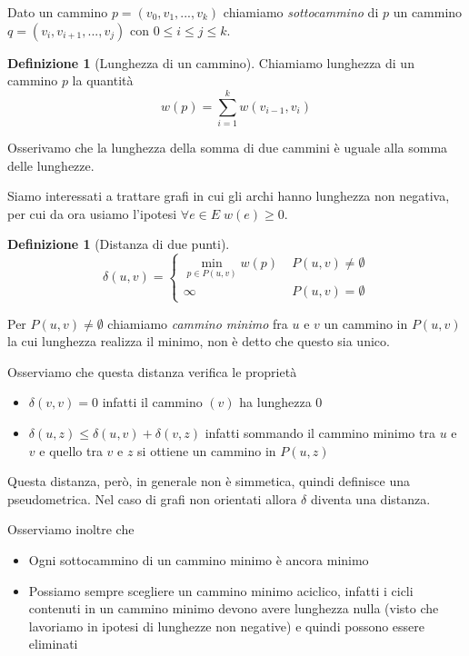 \documentclass[a4paper,10pt]{amsbook}
\newcounter{counter1}
\theoremstyle{plain}
\theoremstyle{definition}
\newtheorem{mydef}[counter1]{Definizione}
\theoremstyle{remark}
\newcommand{\pa}[1]{\left(#1\right)}
\begin{document}
Dato un cammino $p = ( v_0, v_1, ..., v_k)$ chiamiamo
\textit{sottocammino} di $p$ un cammino $q = ( v_i , v_{i+1}, ... ,
v_j )$ con $0 \le i \le j \le k$.

\begin{mydef}[Lunghezza di un cammino]
  Chiamiamo lunghezza di un cammino $p$ la quantità
  \[ w(p) = \sum _{i=1} ^k w \pa{ v_{i-1}, v_i } \]
\end{mydef}

Osserivamo che la lunghezza della somma di due cammini è uguale alla
somma delle lunghezze.

Siamo interessati a trattare grafi in cui gli archi hanno lunghezza
non negativa, per cui da ora usiamo l'ipotesi $\forall e \in E \; w(e)
\ge 0$.

\begin{mydef}[Distanza di due punti]
  \[ \delta(u,v) = \left\{
    \begin{matrix}
      \min \limits_{p \in P(u,v)} { w(p) } & \; P(u,v) \neq \emptyset \\
      \infty & \; P(u,v) = \emptyset
    \end{matrix}
    \right.
    \]
\end{mydef}

Per $P(u,v) \neq \emptyset$ chiamiamo \textit{cammino minimo} fra $u$
e $v$ un cammino in $P(u,v)$ la cui lunghezza realizza il minimo, non
\`e detto che questo sia unico.

Osserviamo che questa distanza verifica le proprietà
\begin{itemize}
\item $\delta(v,v) = 0$ infatti il cammino $(v)$ ha lunghezza $0$
\item $\delta(u,z) \le \delta(u,v) + \delta(v,z)$ infatti sommando il
  cammino minimo tra $u$ e $v$ e quello tra $v$ e $z$ si ottiene un
  cammino in $P(u,z)$
\end{itemize}
Questa distanza, però, in generale non è simmetica, quindi definisce
una pseudometrica. Nel caso di grafi non orientati allora $\delta$
diventa una distanza.

Osserviamo inoltre che
\begin{itemize}
\item Ogni sottocammino di un cammino minimo è ancora minimo
\item Possiamo sempre scegliere un cammino minimo aciclico, infatti i
  cicli contenuti in un cammino minimo devono avere lunghezza nulla
  (visto che lavoriamo in ipotesi di lunghezze non negative) e quindi
  possono essere eliminati
\end{itemize}
\end{document}
